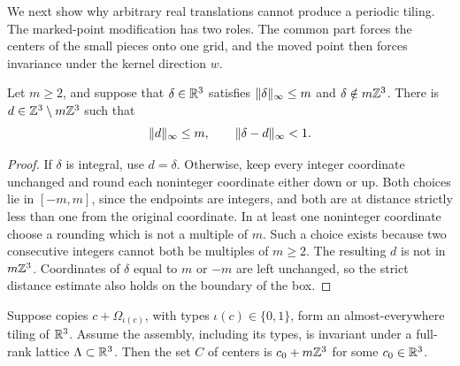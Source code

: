 We next show why arbitrary real translations cannot produce a
periodic tiling.  The marked-point modification has two roles.
The common part forces the centers of the small pieces onto one
grid, and the moved point then forces invariance under the kernel
direction $w$.

\begin{lemma}
\label{geom:rounding}
Let $m\geq2$, and suppose that $\delta\in\mathbb R^3$ satisfies
$\lVert\delta\rVert_\infty\leq m$ and $\delta\notin m\mathbb Z^3$.  There is
$d\in\mathbb Z^3\setminus m\mathbb Z^3$ such that
\[
 \lVert d\rVert_\infty\leq m,
 \qquad \lVert\delta-d\rVert_\infty<1.
\]
\end{lemma}

\begin{proof}
If $\delta$ is integral, use $d=\delta$.  Otherwise, keep every
integer coordinate unchanged and round each noninteger coordinate
either down or up.  Both choices lie in $[-m,m]$, since the
endpoints are integers, and both are at distance strictly less than
one from the original coordinate.  In at least one noninteger
coordinate choose a rounding which is not a multiple of $m$.
Such a choice exists because two consecutive integers cannot both
be multiples of $m\geq2$.  The resulting $d$ is not in $m\mathbb Z^3$.
Coordinates of $\delta$ equal to $m$ or $-m$ are left unchanged, so
the strict distance estimate also holds on the boundary of the box.
\end{proof}

\begin{lemma}
\label{geom:grid}
Suppose copies $c+\Omega_{\iota(c)}$, with types
$\iota(c)\in\{0,1\}$, form an almost-everywhere tiling of $\mathbb R^3$.
Assume the assembly, including its types, is invariant under a
full-rank lattice $\Lambda\subset\mathbb R^3$.  Then the set $C$ of centers
is $c_0+m\mathbb Z^3$ for some $c_0\in\mathbb R^3$.
\end{lemma}

